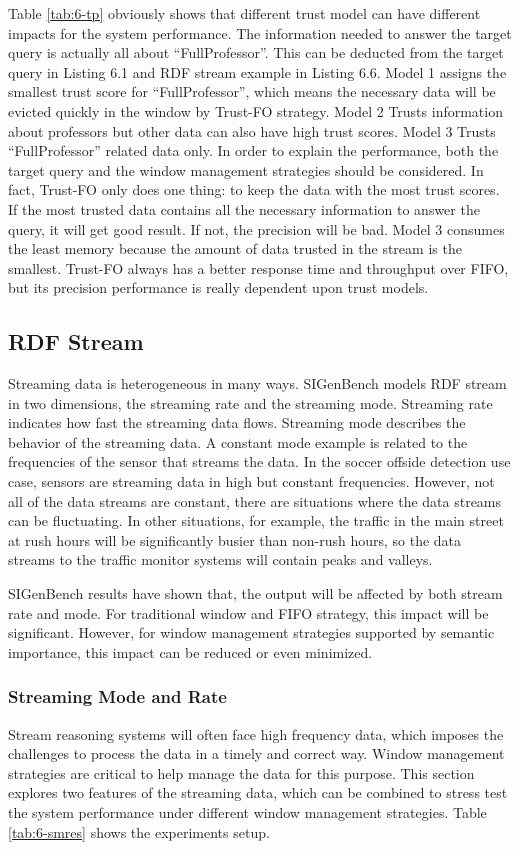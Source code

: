 Table \ref{tab:6-tp} obviously shows that different trust model can have different impacts for the system performance. 
The information needed to answer the target query is actually all about ``FullProfessor''.
This can be deducted from the target query in Listing 6.1 and RDF stream example in Listing 6.6.
Model 1 assigns the smallest trust score for ``FullProfessor'', which means the necessary data will be evicted quickly in the window by Trust-FO strategy. 
Model 2 Trusts information about professors but other data can also have high trust scores.
Model 3 Trusts ``FullProfessor'' related data only.
In order to explain the performance, both the target query and the window management strategies should be considered. 
In fact, Trust-FO only does one thing: to keep the data with the most trust scores.
If the most trusted data contains all the necessary information to answer the query, it will get good result. 
If not, the precision will be bad. 
Model 3 consumes the least memory because the amount of data trusted in the stream is the smallest. 
Trust-FO always has a better response time and throughput over FIFO, but its precision performance is really dependent upon trust models. 
%
\subsection{RDF Stream}
Streaming data is heterogeneous in many ways. 
SIGenBench models RDF stream in two dimensions, the streaming rate and the streaming mode.
Streaming rate indicates how fast the streaming data flows. 
Streaming mode describes the behavior of the streaming data.
A constant mode example is related to the frequencies of the sensor that streams the data. 
In the soccer offside detection use case, sensors are streaming data in high but constant frequencies. 
However, not all of the data streams are constant, there are situations where the data streams can be fluctuating. 
In other situations, for example, the traffic in the main street at rush hours will be significantly busier than non-rush hours, so the data streams to the traffic monitor systems will contain peaks and valleys.


SIGenBench results have shown that, the output will be affected by both stream rate and mode.
For traditional window and FIFO strategy, this impact will be significant. 
However, for window management strategies supported by semantic importance, this impact can be reduced or even minimized. 
%
\subsubsection{Streaming Mode and Rate}
Stream reasoning systems will often face high frequency data, which imposes the challenges to process the data in a timely and correct way. 
Window management strategies are critical to help manage the data for this purpose. 
This section explores two features of the streaming data, which can be combined to stress test the system performance under different window management strategies. 
Table \ref{tab:6-smres} shows the experiments setup.

